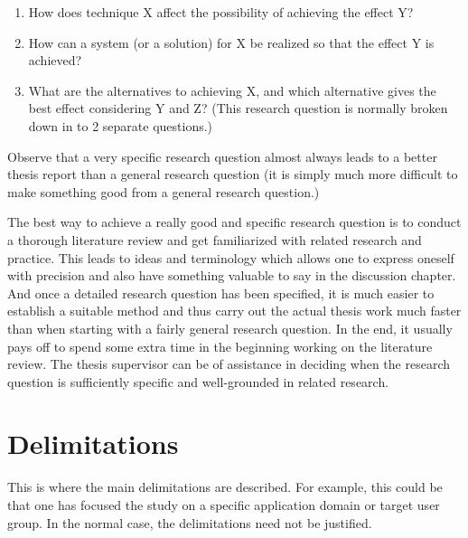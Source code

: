 \begin{enumerate}
\item How does technique X affect the possibility of achieving the
  effect Y?

\item How can a system (or a solution) for X be realized so
  that the effect Y is achieved?

\item What are the alternatives to
  achieving X, and which alternative gives the best effect considering
  Y and Z? (This research question is normally broken down in to 2
  separate questions.)

\end{enumerate}


Observe that a very specific research question almost always
leads to a better thesis report than a general research question
(it is simply much more difficult to make something good
from a general research question.)

The best way to achieve a really good and specific research
question is to conduct a thorough literature review and get
familiarized with related research and practice. This leads to
ideas and terminology which allows one to express oneself
with precision and also have something valuable to say in the
discussion chapter. And once a detailed research question
has been specified, it is much easier to establish a suitable
method and thus carry out the actual thesis work much faster
than when starting with a fairly general research question. In
the end, it usually pays off to spend some extra time in the
beginning working on the literature review. The thesis
supervisor can be of assistance in deciding when the research
question is sufficiently specific and well-grounded in related
research.

\section{Delimitations}
\label{sec:delimitations}

This is where the main delimitations are described. For
example, this could be that one has focused the study on a
specific application domain or target user group. In the
normal case, the delimitations need not be justified.




